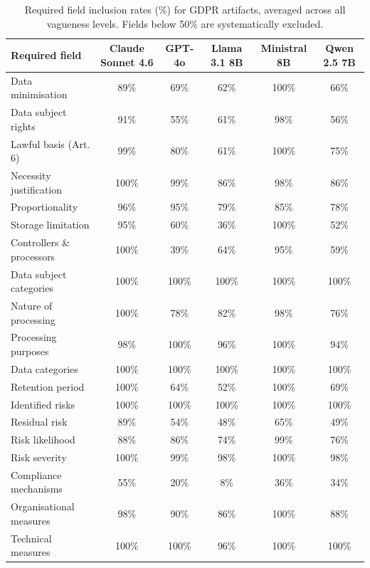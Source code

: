 \begin{table}[t]
  \centering
  \caption{Required field inclusion rates (\%) for GDPR artifacts, averaged across all vagueness levels. Fields below 50\% are systematically excluded.}
  \label{tab:gdpr_field_inclusion}
  \begin{tabular}{lccccc}
    \toprule
    Required field & Claude Sonnet 4.6 & GPT-4o & Llama 3.1 8B & Ministral 8B & Qwen 2.5 7B \\
    \midrule
    Data minimisation & 89\% & 69\% & 62\% & 100\% & 66\% \\
    Data subject rights & 91\% & 55\% & 61\% & 98\% & 56\% \\
    Lawful basis (Art. 6) & 99\% & 80\% & 61\% & 100\% & 75\% \\
    Necessity justification & 100\% & 99\% & 86\% & 98\% & 86\% \\
    Proportionality & 96\% & 95\% & 79\% & 85\% & 78\% \\
    Storage limitation & 95\% & 60\% & 36\% & 100\% & 52\% \\
    Controllers \& processors & 100\% & 39\% & 64\% & 95\% & 59\% \\
    Data subject categories & 100\% & 100\% & 100\% & 100\% & 100\% \\
    Nature of processing & 100\% & 78\% & 82\% & 98\% & 76\% \\
    Processing purposes & 98\% & 100\% & 96\% & 100\% & 94\% \\
    Data categories & 100\% & 100\% & 100\% & 100\% & 100\% \\
    Retention period & 100\% & 64\% & 52\% & 100\% & 69\% \\
    Identified risks & 100\% & 100\% & 100\% & 100\% & 100\% \\
    Residual risk & 89\% & 54\% & 48\% & 65\% & 49\% \\
    Risk likelihood & 88\% & 86\% & 74\% & 99\% & 76\% \\
    Risk severity & 100\% & 99\% & 98\% & 100\% & 98\% \\
    Compliance mechanisms & 55\% & 20\% & 8\% & 36\% & 34\% \\
    Organisational measures & 98\% & 90\% & 86\% & 100\% & 88\% \\
    Technical measures & 100\% & 100\% & 96\% & 100\% & 100\% \\
    \bottomrule
  \end{tabular}
\end{table}

